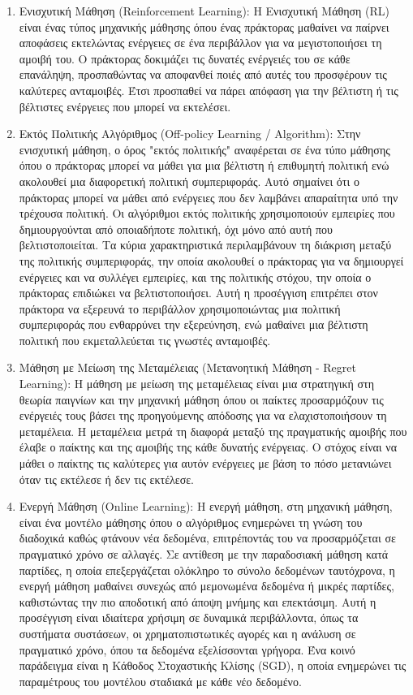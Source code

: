 \begin{enumerate}
    \item Ενισχυτική Μάθηση (Reinforcement Learning): Η Ενισχυτική Μάθηση (RL) είναι ένας τύπος μηχανικής μάθησης όπου ένας πράκτορας μαθαίνει να παίρνει αποφάσεις εκτελώντας ενέργειες σε ένα περιβάλλον για να μεγιστοποιήσει τη αμοιβή του. Ο πράκτορας δοκιμάζει τις δυνατές ενέργειές του σε κάθε επανάληψη, προσπαθώντας να αποφανθεί ποιές από αυτές του προσφέρουν τις καλύτερες ανταμοιβές. Έτσι προσπαθεί να πάρει απόφαση για την βέλτιστη ή τις βέλτιστες ενέργειες που μπορεί να εκτελέσει. 

    \item Εκτός Πολιτικής Αλγόριθμος (Off-policy Learning / Algorithm): Στην ενισχυτική μάθηση, ο όρος "εκτός πολιτικής" αναφέρεται σε ένα τύπο μάθησης όπου ο πράκτορας μπορεί να μάθει για μια βέλτιστη ή επιθυμητή πολιτική ενώ ακολουθεί μια διαφορετική πολιτική συμπεριφοράς. Αυτό σημαίνει ότι ο πράκτορας μπορεί να μάθει από ενέργειες που δεν λαμβάνει απαραίτητα υπό την τρέχουσα πολιτική. Οι αλγόριθμοι εκτός πολιτικής χρησιμοποιούν εμπειρίες που δημιουργούνται από οποιαδήποτε πολιτική, όχι μόνο από αυτή που βελτιστοποιείται. Τα κύρια χαρακτηριστικά περιλαμβάνουν τη διάκριση μεταξύ της πολιτικής συμπεριφοράς, την οποία ακολουθεί ο πράκτορας για να δημιουργεί ενέργειες και να συλλέγει εμπειρίες, και της πολιτικής στόχου, την οποία ο πράκτορας επιδιώκει να βελτιστοποιήσει. Αυτή η προσέγγιση επιτρέπει στον πράκτορα να εξερευνά το περιβάλλον χρησιμοποιώντας μια πολιτική συμπεριφοράς που ενθαρρύνει την εξερεύνηση, ενώ μαθαίνει μια βέλτιστη πολιτική που εκμεταλλεύεται τις γνωστές ανταμοιβές. 

    \item Μάθηση με Μείωση της Μεταμέλειας (Μετανοητική Μάθηση - Regret Learning): Η μάθηση με μείωση της μεταμέλειας είναι μια στρατηγική στη θεωρία παιγνίων και την μηχανική μάθηση όπου οι παίκτες προσαρμόζουν τις ενέργειές τους βάσει της προηγούμενης απόδοσης για να ελαχιστοποιήσουν τη μεταμέλεια. Η μεταμέλεια μετρά τη διαφορά μεταξύ της πραγματικής αμοιβής που έλαβε ο παίκτης και της αμοιβής της κάθε δυνατής ενέργειας. Ο στόχος είναι να μάθει ο παίκτης τις καλύτερες για αυτόν ενέργειες με βάση το πόσο μετανιώνει όταν τις εκτέλεσε ή δεν τις εκτέλεσε. 

    \item Ενεργή Μάθηση (Online Learning): Η ενεργή μάθηση, στη μηχανική μάθηση, είναι ένα μοντέλο μάθησης όπου ο αλγόριθμος ενημερώνει τη γνώση του διαδοχικά καθώς φτάνουν νέα δεδομένα, επιτρέποντάς του να προσαρμόζεται σε πραγματικό χρόνο σε αλλαγές. Σε αντίθεση με την παραδοσιακή μάθηση κατά παρτίδες, η οποία επεξεργάζεται ολόκληρο το σύνολο δεδομένων ταυτόχρονα, η ενεργή μάθηση μαθαίνει συνεχώς από μεμονωμένα δεδομένα ή μικρές παρτίδες, καθιστώντας την πιο αποδοτική από άποψη μνήμης και επεκτάσιμη. Αυτή η προσέγγιση είναι ιδιαίτερα χρήσιμη σε δυναμικά περιβάλλοντα, όπως τα συστήματα συστάσεων, οι χρηματοπιστωτικές αγορές και η ανάλυση σε πραγματικό χρόνο, όπου τα δεδομένα εξελίσσονται γρήγορα. Ένα κοινό παράδειγμα είναι η Κάθοδος Στοχαστικής Κλίσης (SGD), η οποία ενημερώνει τις παραμέτρους του μοντέλου σταδιακά με κάθε νέο δεδομένο. 


\end{enumerate}
